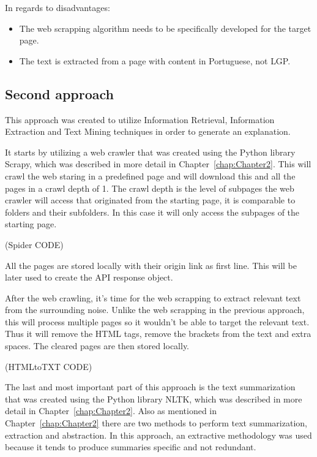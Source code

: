 In regards to disadvantages:
\begin{itemize}
        \item The web scrapping algorithm needs to be specifically developed for the target page.
        \item The text is extracted from a page with content in Portuguese, not \gls{LGP}.
\end{itemize}

\subsection{Second approach}

This approach was created to utilize Information Retrieval, Information Extraction and Text Mining techniques in order to generate an explanation.

It starts by utilizing a web crawler that was created using the Python library Scrapy, which was described in more detail in Chapter~\ref{chap:Chapter2}.
This will crawl the web staring in a predefined page and will download this and all the pages in a crawl depth of 1.
The crawl depth is the level of subpages the web crawler will access that originated from the starting page, it is comparable to folders and their subfolders.
In this case it will only access the subpages of the starting page.

(Spider CODE) %

All the pages are stored locally with their origin link as first line.
This will be later used to create the API response object.

After the web crawling, it's time for the web scrapping to extract relevant text from the surrounding noise.
Unlike the web scrapping in the previous approach, this will process multiple pages so it wouldn't be able to target the relevant text.
Thus it will remove the HTML tags, remove the brackets from the text and extra spaces.
The cleared pages are then stored locally.

(HTMLtoTXT CODE) %

The last and most important part of this approach is the text summarization that was created using the Python library NLTK, which was described in more detail in Chapter~\ref{chap:Chapter2}.
Also as mentioned in Chapter~\ref{chap:Chapter2} there are two methods to perform text summarization, extraction and abstraction.
In this approach, an extractive methodology was used because it tends to produce summaries specific and not redundant\cite{cheung2008comparing}.

